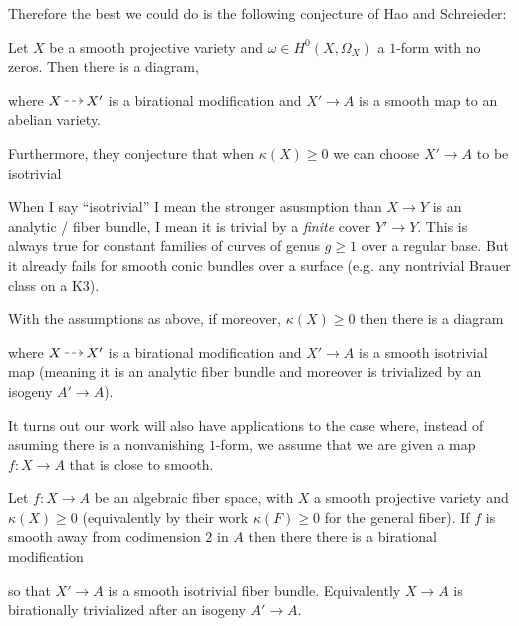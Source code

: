 \documentclass[12pt]{article}
\begin{document}
Therefore the best we could do is the following conjecture of Hao and Schreieder:

\begin{conj}
Let $X$ be a smooth projective variety and $\omega \in H^0(X, \Omega_X)$ a $1$-form with no zeros. Then there is a diagram,
\begin{center}
\end{center}
where $X \rat X'$ is a birational modification and $X' \to A$ is a smooth map to an abelian variety.
\end{conj}

Furthermore, they conjecture that when $\kappa(X) \ge 0$ we can choose $X' \to A$ to be isotrivial 

\begin{rmk}
When I say ``isotrivial'' I mean the stronger asusmption than $X \to Y$ is an analytic / \etale fiber bundle, I mean it is trivial by a \textit{finite} \etale cover $Y' \to Y$. This is always true for constant families of curves of genus $g \ge 1$ over a regular base. But it already fails for smooth conic bundles over a surface (e.g. any nontrivial Brauer class on a K3). 
\end{rmk}

\begin{conj}
With the assumptions as above, if moreover, $\kappa(X) \ge 0$ then there is a diagram
\begin{center}
\end{center}
where $X \rat X'$ is a birational modification and $X' \to A$ is a smooth isotrivial map (meaning it is an analytic fiber bundle and moreover is trivialized by an isogeny $A' \to A$).
\end{conj}

It turns out our work will also have applications to the case where, instead of asuming there is a nonvanishing $1$-form, we assume that we are given a map $f : X \to A$ that is close to smooth.

\begin{conj}
Let $f : X \to A$ be an algebraic fiber space, with $X$ a smooth projective variety and $\kappa(X) \ge 0$ (equivalently by their work $\kappa(F) \ge 0$ for the general fiber). If $f$ is smooth away from codimension $2$ in $A$ then there there is a birational modification
\begin{center}
\end{center}
so that $X' \to A$ is a smooth isotrivial fiber bundle. Equivalently $X \to A$ is birationally trivialized after an isogeny $A' \to A$. 
\end{conj}
\end{document}
